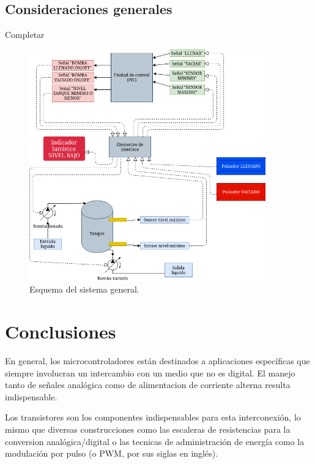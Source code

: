 \documentclass[a4paper]{article}
\newenvironment{ejercicios}
    {\setcounter{secnumdepth}{3}
    \renewcommand\thesubsection{Ejercicio \arabic{subsection}}}
    {\setcounter{secnumdepth}{0}}
\begin{document}
\begin{ejercicios}

    \subsection{Consideraciones generales}\label{ej:monitoreo}

    Completar

    \begin{figure}[h]\centering
        \includegraphics[height=10cm]{diagrama_sistema.jpg}
        \caption{Esquema del sistema general.}\label{fig:esquematico1}
    \end{figure}

    
\end{ejercicios}


\section{Conclusiones}

En general, los microcontroladores están destinados a aplicaciones
específicas que siempre involucran un intercambio con un medio que 
no es digital. El manejo tanto de señales analógica como de 
alimentacion de corriente alterna resulta indispensable.

Los transistores son los componentes indispensables para esta 
interconexión, lo mismo que diversas construcciones como las 
escaleras de resistencias para la conversion analógica/digital
o las tecnicas de administración de energía como la modulación
por pulso (o PWM, por sus siglas en inglés).
\end{document}
